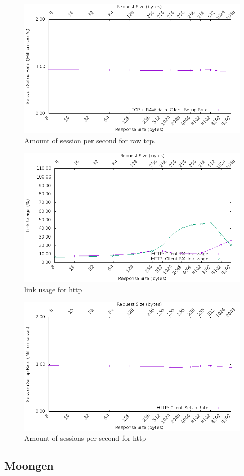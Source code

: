 \begin{figure}
  \includegraphics[scale=0.6]{images/raw_setup.png}
  \caption{Amount of session per second for raw tcp.}
  \label{fig:rawtcpsession}
\end{figure}

\begin{figure}
  \includegraphics[scale=0.6]{images/http_link_usage.png}
  \caption{link usage for http}
  \label{fig:httplink}
\end{figure}

\begin{figure}
  \includegraphics[scale=0.6]{images/http_setup.png}
  \caption{Amount of sessions per second for http}
  \label{fig:httpsession}
\end{figure}


\subsection{Moongen}




